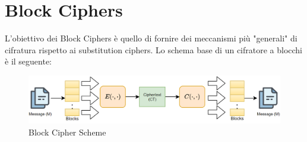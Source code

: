\chapter{Block Ciphers}\label{chap:blkcipher}
L'obiettivo dei Block Ciphers è quello di fornire dei meccanismi più "generali" di cifratura rispetto ai substitution ciphers. Lo schema base di un cifratore a blocchi è il seguente:
\begin{figure}[h]
    \centering
    \includegraphics{image/blockcipher.png}
    \caption{Block Cipher Scheme}
    \label{fig:blkcipher}
\end{figure}
